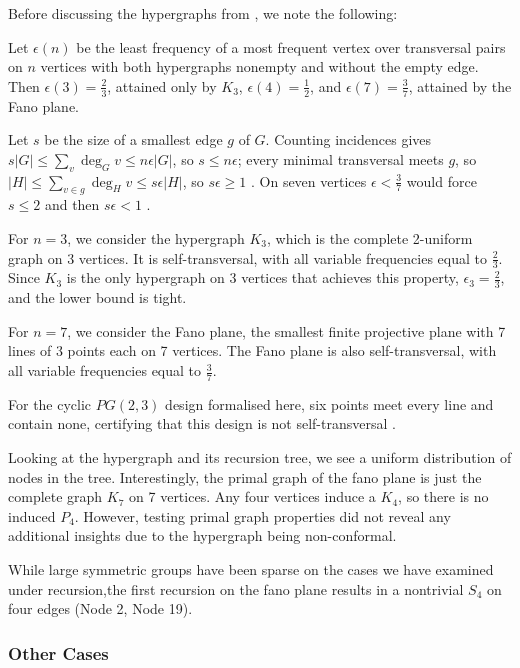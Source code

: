 Before discussing the hypergraphs from \cite{SS24}, we note the following:

\begin{observation}\label{obs:fano-tight}
Let $\epsilon(n)$ be the least frequency of a most frequent vertex over transversal pairs on $n$ vertices with both hypergraphs nonempty and without the empty edge. Then $\epsilon(3)=\frac{2}{3}$, attained only by $K_3$, $\epsilon(4)=\frac{1}{2}$, and $\epsilon(7)=\frac{3}{7}$, attained by the Fano plane.
\end{observation}

Let $s$ be the size of a smallest edge $g$ of $G$. Counting incidences gives $s|G|\le\sum_v\deg_G v\le n\epsilon|G|$, so $s\le n\epsilon$; every minimal transversal meets $g$, so $|H|\le\sum_{v\in g}\deg_H v\le s\epsilon|H|$, so $s\epsilon\ge1$ . On seven vertices $\epsilon<\frac{3}{7}$ would force $s\le2$ and then $s\epsilon<1$ .

For $n=3$, we consider the hypergraph $K_3$, which is the complete 2-uniform graph on 3 vertices. It is self-transversal, with all variable frequencies equal to $\frac{2}{3}$. Since $K_3$ is the only hypergraph on 3 vertices that achieves this property, $\epsilon_3=\frac{2}{3}$, and the lower bound is tight.

For $n=7$, we consider the Fano plane, the smallest finite projective plane with 7 lines of 3 points each on 7 vertices. The Fano plane is also self-transversal, with all variable frequencies equal to $\frac{3}{7}$.

For the cyclic $PG(2,3)$ design formalised here, six points meet every
line and contain none, certifying that this design is not self-transversal
.

Looking at the hypergraph and its recursion tree, we see a uniform distribution of nodes in the tree. Interestingly, the primal graph of the fano plane is just the complete graph $K_7$ on 7 vertices. Any four vertices induce a $K_4$, so there is no induced $P_4$. However, testing primal graph properties did not reveal any additional insights due to the hypergraph being non-conformal.

While large symmetric groups have been sparse on the cases we have examined under \FKA{} recursion,the first recursion on the fano plane results in a nontrivial $S_4$ on four edges (Node 2, Node 19).

\subsubsection*{Other Cases}

